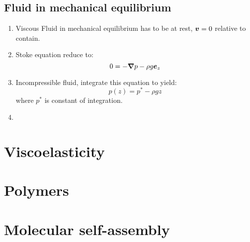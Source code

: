 \documentclass[12pt,a4paper]{article}
\begin{document}
        \subsection{Fluid in mechanical equilibrium}
            \begin{enumerate}
                \item Viscous Fluid in mechanical equilibrium has to be at rest, $\vb*{v}=0$ relative to contain.
                \item Stoke equation reduce to:
                \begin{equation}
                    0 = -\grad{p} -\rho g \vb*{e}_z
                \end{equation}
                \item Incompressible fluid, integrate this equation to yield:
                \begin{equation}
                    p(z) = p^{*} - \rho g z
                \end{equation}
                where $p^{*}$ is constant of integration.
                \item 
            \end{enumerate}

\section{Viscoelasticity}
\section{Polymers}
\section{Molecular self-assembly}
\end{document}
